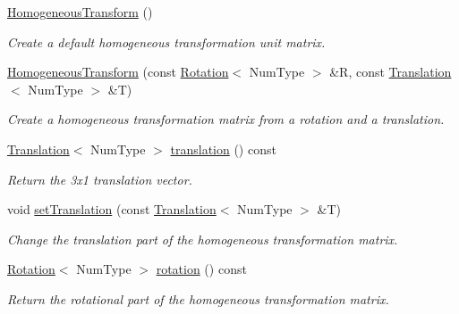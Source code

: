 \begin{DoxyCompactItemize}
\item 
\hypertarget{classscrews_1_1_homogeneous_transform_a7c02181ea9cd4ab74fa2c5cc576110fb}{\hyperlink{classscrews_1_1_homogeneous_transform_a7c02181ea9cd4ab74fa2c5cc576110fb}{Homogeneous\+Transform} ()}\label{classscrews_1_1_homogeneous_transform_a7c02181ea9cd4ab74fa2c5cc576110fb}

\begin{DoxyCompactList}\small\item\em Create a default homogeneous transformation unit matrix. \end{DoxyCompactList}\item 
\hyperlink{classscrews_1_1_homogeneous_transform_a57e7ca6d108c2a427daa6d38a14990ec}{Homogeneous\+Transform} (const \hyperlink{singletonscrews_1_1_rotation}{Rotation}$<$ Num\+Type $>$ \&R, const \hyperlink{singletonscrews_1_1_translation}{Translation}$<$ Num\+Type $>$ \&T)
\begin{DoxyCompactList}\small\item\em Create a homogeneous transformation matrix from a rotation and a translation. \end{DoxyCompactList}\item 
\hyperlink{singletonscrews_1_1_translation}{Translation}$<$ Num\+Type $>$ \hyperlink{classscrews_1_1_homogeneous_transform_aacc88fcb1e2f0467481706cef3325172}{translation} () const 
\begin{DoxyCompactList}\small\item\em Return the 3x1 translation vector. \end{DoxyCompactList}\item 
void \hyperlink{classscrews_1_1_homogeneous_transform_a777414acc4a12cb8201f1b2f079d1178}{set\+Translation} (const \hyperlink{singletonscrews_1_1_translation}{Translation}$<$ Num\+Type $>$ \&T)
\begin{DoxyCompactList}\small\item\em Change the translation part of the homogeneous transformation matrix. \end{DoxyCompactList}\item 
\hyperlink{singletonscrews_1_1_rotation}{Rotation}$<$ Num\+Type $>$ \hyperlink{classscrews_1_1_homogeneous_transform_a6ff95f963c60c77571321e03d845b588}{rotation} () const 
\begin{DoxyCompactList}\small\item\em Return the rotational part of the homogeneous transformation matrix. \end{DoxyCompactList}\item 

\end{DoxyCompactItemize}
